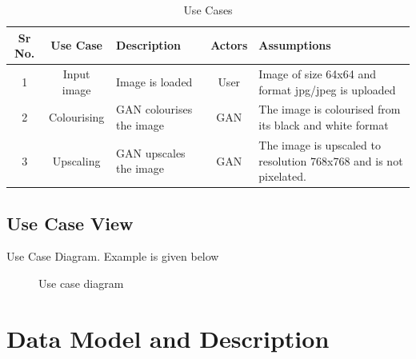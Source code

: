 \documentclass[oneside,a4paper,12pt]{report}
\begin{document}
\begin{table}[!htbp]
\begin{center}
\def\arraystretch{1.5}
\begin{tabularx}{\textwidth}{| c | c | X | c | X |}
\hline
Sr No.	& Use Case	& Description	& Actors	& Assumptions \\
\hline
1& Input image & Image is loaded & User & Image of size 64x64 and format jpg/jpeg is uploaded  \\ \hline
2& Colourising & GAN colourises the image & GAN & The image is colourised from its black and white format \\ \hline
3& Upscaling & GAN upscales the image & GAN & The image is upscaled to resolution 768x768 and is not pixelated. \\ \hline
\end{tabularx}
\end{center}
\caption{Use Cases}
\label{tab:usecase}
\end{table}


\subsection{Use Case View}
Use Case Diagram. Example is given below
\begin{center}
	\begin{figure}[!htbp]
		\centering
	  \caption{Use case diagram}
	  \label{fig:usecase}
	\end{figure}
\end{center}

\section{Data Model and Description}
\end{document}
